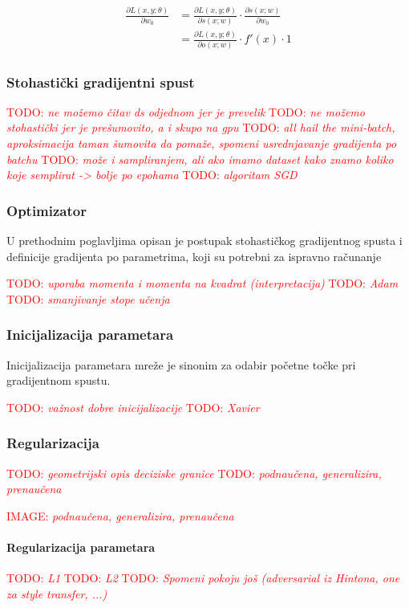 \documentclass[times, utf8, diplomski]{fer}
\def\pfrac#1#2{\frac{\partial #1}{\partial #2}}
\def\TODO#1{\noindent\textcolor{red}{TODO: \textit{#1}}\newline}
\def\todo#1{\TODO{#1}}
\def\todoimg#1{\begin{center} \textcolor{red}{IMAGE: \textit{#1}} \end{center}}
\begin{document}
\begin{align}
\begin{split}
\pfrac{L(x,y;\theta)}{w_0} &= \pfrac{L(x,y;\theta)}{s(x;w)} \cdot \pfrac{s(x;w)}{w_0} \\
&= \pfrac{L(x,y;\theta)}{o(x;w)} \cdot f'(x) \cdot 1
\end{split}
\end{align}

\subsubsection{Stohastički gradijentni spust}

\todo{ne možemo čitav ds odjednom jer je prevelik}
\todo{ne možemo stohastički jer je prešumovito, a i skupo na gpu}
\todo{all hail the mini-batch, aproksimacija taman šumovita da pomaže, spomeni usrednjavanje gradijenta po batchu}
\todo{može i sampliranjem, ali ako imamo dataset kako znamo koliko koje semplirat -> bolje po epohama}
\todo{algoritam SGD}

\subsubsection{Optimizator}
U prethodnim poglavljima opisan je postupak stohastičkog gradijentnog spusta i definicije gradijenta po parametrima, koji su potrebni za ispravno računanje

\todo{uporaba momenta i momenta na kvadrat (interpretacija)}
\todo{Adam}
\todo{smanjivanje stope učenja}

\subsubsection{Inicijalizacija parametara}
Inicijalizacija parametara mreže je sinonim za odabir početne točke pri gradijentnom spustu.

\todo{važnost dobre inicijalizacije}
\todo{Xavier}

\subsubsection{Regularizacija}
\todo{geometrijski opis deciziske granice}
\todo{podnaučena, generalizira, prenaučena}
\todoimg{podnaučena, generalizira, prenaučena}

\paragraph{Regularizacija parametara}
\todo{L1}
\todo{L2}
\todo{Spomeni pokoju još (adversarial iz Hintona, one za style transfer, ...)}
\end{document}
